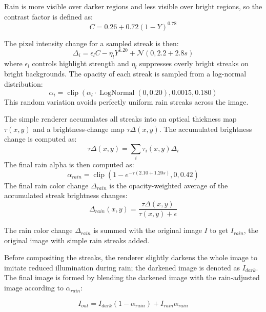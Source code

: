 \documentclass[10pt,letterpaper]{article}
\begin{document}
Rain is more visible over darker regions and less visible over bright regions, so the contrast factor is defined as:
\begin{equation}
C=0.26+0.72(1-Y)^{0.78}
\label{eq:simple-contrast}
\end{equation}

The pixel intensity change for a sampled streak is then:
\begin{equation}
\Delta_i=\epsilon_l C-\eta_l Y^{1.20}+\mathcal{N}(0,2.2+2.8s)
\label{eq:simple-delta}
\end{equation}
where $\epsilon_l$ controls highlight strength and $\eta_l$ suppresses overly bright streaks on bright backgrounds. The opacity of each streak is sampled from a log-normal distribution:
\begin{equation}
\alpha_i=\operatorname{clip}(\alpha_l \cdot \operatorname{LogNormal}(0,0.20),0.0015,0.180)
\label{eq:simple-opacity}
\end{equation}
This random variation avoids perfectly uniform rain streaks across the image.

The simple renderer accumulates all streaks into an optical thickness map $\tau(x,y)$ and a brightness-change map $\tau\Delta(x,y)$. The accumulated brightness change is computed as:
\begin{equation}
\tau\Delta(x,y)=\sum_i \tau_i(x,y)\Delta_i
\label{eq:rain-delta-accumulation}
\end{equation}
The final rain alpha is then computed as:
\begin{equation}
\alpha_{rain}=\operatorname{clip}(1-e^{-\tau(2.10+1.20s)},0,0.42)
\label{eq:simple-rain-alpha}
\end{equation}
The final rain color change $\Delta_{rain}$ is the opacity-weighted average of the accumulated streak brightness changes:
\[
\Delta_{rain}(x,y)=\frac{\tau\Delta(x,y)}{\tau(x,y)+\epsilon}
\]

The rain color change $\Delta_{rain}$ is summed with the original image $I$ to get $I_{rain}$, the original image with simple rain streaks added.

Before compositing the streaks, the renderer slightly darkens the whole image to imitate reduced illumination during rain; the darkened image is denoted as $I_{dark}$. 
The final image is formed by blending the darkened image with the rain-adjusted image according to $\alpha_{rain}$:

\begin{equation}
I_{out} = I_{dark}(1-\alpha_{rain}) + I_{rain}\alpha_{rain}
\end{equation}
\end{document}
